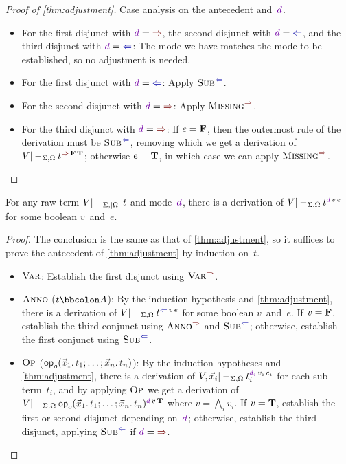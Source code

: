 \begin{proof}[Proof of \cref{thm:adjustment}]
Case analysis on the antecedent and~$\dir{d}$.
\begin{itemize}
\item For the first disjunct with $\dir{d} = {\syn}$, the second disjunct with $\dir{d} = {\chk}$, and the third disjunct with $\dir{d} = {\chk}$:
The mode we have matches the mode to be established, so no adjustment is needed.
\item For the first disjunct with $\dir{d} = {\chk}$:
Apply $\ChkRule{Sub}$.
\item For the second disjunct with $\dir{d} = {\syn}$:
Apply $\SynRule{Missing}$.
\item For the third disjunct with $\dir{d} = {\syn}$:
If $e = \mathbf{F}$, then the outermost rule of the derivation must be $\ChkRule{Sub}$, removing which we get a derivation of $V |-_{\Sigma,\Omega} t^{\syn\,\False\,\True}$;
otherwise $e = \mathbf{T}$, in which case we can apply $\SynRule{Missing}$.
\vspace{-\topsep-\baselineskip}
\end{itemize}
\end{proof}

\begin{theorem}\label{thm:generalised-mode-preprocessing}
For any raw term $V |-_{\Sigma,\left|\Omega\right|} t$ and mode~$\dir{d}$, there is a derivation of\/ $V |-_{\Sigma,\Omega} t^{\dir{d}\,v\,e}$ for some boolean $v$~and~$e$.
\end{theorem}

\begin{proof}
The conclusion is the same as that of \cref{thm:adjustment}, so it suffices to prove the antecedent of \cref{thm:adjustment} by induction on~$t$.
\begin{itemize}
\item $\textnormal{\textsc{Var}}$:
Establish the first disjunct using $\SynRule{Var}$.
\item $\textnormal{\textsc{Anno}}$ ($t \bbcolon A$):
By the induction hypothesis and \cref{thm:adjustment}, there is a derivation of $V |-_{\Sigma,\Omega} t^{\chk\,v\,e}$ for some boolean $v$~and~$e$.
If $v = \mathbf{F}$, establish the third conjunct using $\SynRule{Anno}$ and $\ChkRule{Sub}$; otherwise, establish the first conjunct using $\ChkRule{Sub}$.
\item $\textnormal{\textsc{Op}}$ ($\tmOpts$):
By the induction hypotheses and \cref{thm:adjustment}, there is a derivation of $V, \vec x_i |-_{\Sigma,\Omega} t_i^{\dir{d_i}\,v_i\,e_i}$ for each sub-term~$t_i$, and by applying $\textnormal{\textsc{Op}}$ we get a derivation of $V |-_{\Sigma,\Omega} \tmOpts^{\dir d\,v\,\True}$ where $v = \bigwedge_i v_i$.
If $v = \mathbf{T}$, establish the first or second disjunct depending on~$\dir d$; otherwise, establish the third disjunct, applying $\ChkRule{Sub}$ if $\dir d = {\syn}$.
\vspace{-\topsep-\baselineskip}
\end{itemize}
\end{proof}

